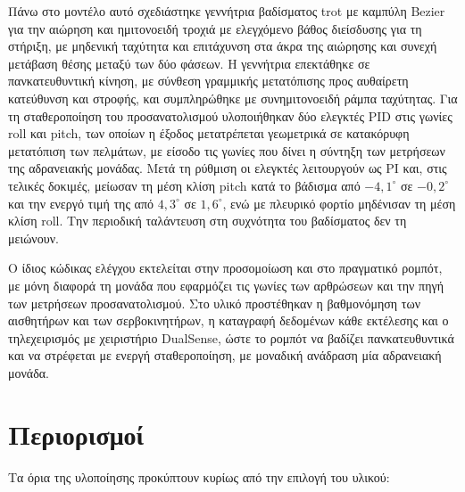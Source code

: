 \documentclass[11pt]{report}
\begin{document}
Πάνω στο μοντέλο αυτό σχεδιάστηκε γεννήτρια βαδίσματος trot με καμπύλη Bezier
για την αιώρηση και ημιτονοειδή τροχιά με ελεγχόμενο βάθος διείσδυσης για τη
στήριξη, με μηδενική ταχύτητα και επιτάχυνση στα άκρα της αιώρησης και συνεχή
μετάβαση θέσης μεταξύ των δύο φάσεων. Η
γεννήτρια επεκτάθηκε σε πανκατευθυντική κίνηση, με σύνθεση γραμμικής
μετατόπισης προς αυθαίρετη κατεύθυνση και στροφής, και συμπληρώθηκε με
συνημιτονοειδή ράμπα ταχύτητας. Για τη σταθεροποίηση του προσανατολισμού
υλοποιήθηκαν δύο ελεγκτές PID στις γωνίες roll και pitch, των οποίων η έξοδος
μετατρέπεται γεωμετρικά σε κατακόρυφη μετατόπιση των πελμάτων, με είσοδο τις
γωνίες που δίνει η σύντηξη των μετρήσεων της αδρανειακής μονάδας. Μετά τη
ρύθμιση οι ελεγκτές λειτουργούν ως PI και, στις τελικές δοκιμές, μείωσαν τη
μέση κλίση pitch κατά το βάδισμα από $-4{,}1^\circ$ σε $-0{,}2^\circ$ και την
ενεργό τιμή της από $4{,}3^\circ$ σε $1{,}6^\circ$, ενώ με πλευρικό φορτίο
μηδένισαν τη μέση κλίση roll. Την περιοδική ταλάντευση στη συχνότητα του
βαδίσματος δεν τη μειώνουν.

Ο ίδιος κώδικας ελέγχου εκτελείται στην προσομοίωση και στο πραγματικό ρομπότ,
με μόνη διαφορά τη μονάδα που εφαρμόζει τις γωνίες των αρθρώσεων και την πηγή
των μετρήσεων προσανατολισμού. Στο υλικό προστέθηκαν η βαθμονόμηση των
αισθητήρων και των σερβοκινητήρων, η καταγραφή δεδομένων κάθε εκτέλεσης και ο
τηλεχειρισμός με χειριστήριο DualSense, ώστε το ρομπότ να βαδίζει
πανκατευθυντικά και να στρέφεται με ενεργή σταθεροποίηση, με μοναδική ανάδραση
μία αδρανειακή μονάδα.

\section{Περιορισμοί}
\label{sec:limitations}
Τα όρια της υλοποίησης προκύπτουν κυρίως από την επιλογή του υλικού:
\end{document}
